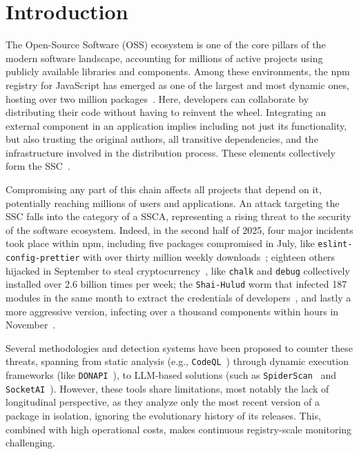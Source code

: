 \chapter{Introduction}
\label{ch:introduction}

The Open-Source Software (OSS) ecosystem is one of the core pillars of the modern software landscape,
accounting for millions of active projects using publicly available libraries and components.
Among these environments, the \ac{npm} registry for JavaScript has emerged as one of the largest and most dynamic ones, 
hosting over two million packages~\cite{9505063}. 
Here, developers can collaborate by distributing their code without having to reinvent the wheel.
Integrating an external component in an application implies including not just its functionality, 
but also trusting the original authors, all transitive dependencies, and the infrastructure involved in the distribution process.
These elements collectively form the \ac{SSC}~\cite{softwareSupplyChain}.

Compromising any part of this chain affects all projects that depend on it, 
potentially reaching millions of users and applications.
An attack targeting the \ac{SSC} falls into the category of a \ac{SSCA}, 
representing a rising threat to the security of the software ecosystem.
Indeed, in the second half of 2025, four major incidents took place within \ac{npm},
including five packages compromised in July, like \texttt{eslint-config-prettier} with over thirty million weekly downloads~\cite{endorlabs2025eslint};
eighteen others hijacked in September to steal cryptocurrency~\cite{henig2025breakdownwidespreadnpmsupplychainattack},
like \texttt{chalk} and \texttt{debug} collectively installed over 2.6 billion times per week;
the \texttt{Shai-Hulud} worm that infected 187 modules in the same month to extract the credentials of developers~\cite{oxsecurity2025npm20hack},
and lastly a more aggressive version, infecting over a thousand components within hours in November~\cite{cutolo2025shaihulud20}.

Several methodologies and detection systems have been proposed to counter these threats, 
spanning from static analysis (e.g., \texttt{CodeQL}~\cite{zahan2025leveraginglargelanguagemodels})
through dynamic execution frameworks (like \texttt{DONAPI}~\cite{huang2024donapimaliciousnpmpackages}),
to \ac{LLM}-based solutions (such as \texttt{SpiderScan}~\cite{10.1145/3691620.3695492} and \texttt{SocketAI}~\cite{zahan2025leveraginglargelanguagemodels}).
However, these tools share limitations, 
most notably the lack of longitudinal perspective,
as they analyze only the most recent version of a package in isolation, ignoring the evolutionary history of its releases.
This, combined with high operational costs, makes continuous registry-scale monitoring challenging.

